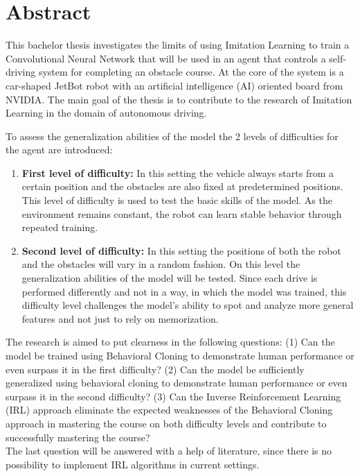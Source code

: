 \section*{Abstract}
\label{sec:Abstract}

This bachelor thesis investigates the limits of using Imitation Learning \autocite{10.1145/3054912} to train a Convolutional Neural Network that will be used in an agent that controls a self-driving system for completing an obstacle course. At the core of the system is a car-shaped JetBot robot with an artificial intelligence (AI) oriented board from NVIDIA. The main goal of the thesis is to contribute to the research of Imitation Learning in the domain of autonomous driving.

To assess the generalization abilities of the model the 2 levels of difficulties for the agent are introduced:
\begin{enumerate}
  \item \textbf{First level of difficulty:} In this setting the vehicle always starts from a certain position and the obstacles are also fixed at predetermined positions. This level of difficulty is used to test the basic skills of the model. As the environment remains constant, the robot can learn stable behavior through repeated training.
  \item \textbf{Second level of difficulty:} In this setting the positions of both the robot and the obstacles will vary in a random fashion. On this level the generalization abilities of the model will be tested. Since each drive is performed differently and not in a way, in which the model was trained, this difficulty level challenges the model's ability to spot and analyze more general features and not just to rely on memorization.
\end{enumerate}

The research is aimed to put clearness in the following questions: (1) Can the model be trained using Behavioral Cloning \autocite{8855753} to demonstrate human performance or even surpass it in the first difficulty? (2) Can the model be sufficiently generalized using behavioral cloning to demonstrate human performance or even surpass it in the second difficulty? (3) Can the Inverse Reinforcement Learning (IRL) \autocite{ng2000algorithms} \autocite{neu2012apprenticeshiplearningusinginverse} \autocites{lee2021approximateinversereinforcementlearning} approach eliminate the expected weaknesses of the Behavioral Cloning approach in mastering the course on both difficulty levels and contribute to successfully mastering the course? \\
The last question will be answered with a help of literature, since there is no possibility to implement IRL algorithms in current settings.
